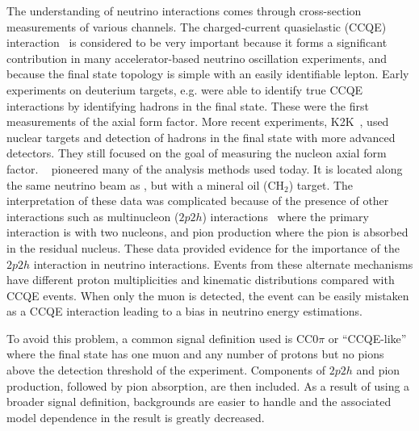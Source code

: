 \documentclass[%
twocolumn,
 amsmath,amssymb,
 aps,
prd,
superscriptaddress,showpacs]{revtex4-2}
\begin{document}
The understanding of neutrino interactions comes through cross-section measurements of various channels.
The charged-current quasielastic (CCQE) interaction~\cite{nustec-review} is considered to be very important because it forms a significant contribution in many accelerator-based neutrino oscillation experiments, and because the final state topology is simple with an easily identifiable lepton.
Early experiments on deuterium targets, e.g. \cite{Kitagaki:1983px} were able to identify true CCQE interactions by identifying hadrons in the final state.
These were the first measurements of the axial form factor.
More recent experiments, K2K~\cite{Gran:2006jn}, used nuclear targets and detection of hadrons in the final state with more advanced detectors.
They still focused on the goal of measuring the nucleon axial form factor.
\mb~\cite{miniboone-ccqe} pioneered many of the analysis methods used today.
It is located along the same neutrino beam as \mub, but with a mineral oil (CH$_2$) target.  
The interpretation of these data was complicated because of the presence of other interactions such as multinucleon ($2p2h$) interactions~\cite{Martini:2011wp,Nieves:2011ppTHEORY} where the primary interaction is with two nucleons, and pion production where the pion is absorbed in the residual nucleus.
These data provided evidence for the importance of  the $2p2h$ interaction in neutrino interactions.
 Events from these alternate mechanisms have different proton multiplicities and kinematic distributions compared with CCQE events. When only the muon is detected, the event can be easily mistaken as a CCQE interaction leading to a bias in neutrino energy estimations.

To avoid this problem, a common signal definition used is CC$0\pi$ or ``CCQE-like'' where the final state has one muon and any number of protons but no pions above the detection threshold of the experiment.
Components of $2p2h$ and pion production, followed by pion absorption, are then included.
As a result of using a broader signal definition, backgrounds are easier to handle and the associated model dependence in the result is greatly decreased.
\end{document}
